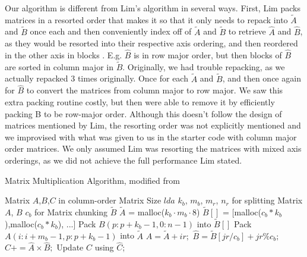 \documentclass{article}
\begin{document}
Our algorithm is different from Lim's algorithm in several ways. First, Lim packs matrices in a resorted order that makes it so that it only needs to repack into $\tilde{A}$ and $\tilde{B}$ once each and then conveniently index off of $\tilde{A}$ and $\tilde{B}$ to retrieve $\hat{A}$ and $\hat{B}$, as they would be resorted into their respective axis ordering, and then reordered in the other axis in blocks \cite{10.1007/s10586-018-2810-y}. E.g. $\hat{B}$ is in row major order, but then blocks of $\hat{B}$ are sorted in column major in $\tilde{B}$. Originally, we had trouble repacking, as we actually repacked 3 times originally. Once for each $\tilde{A}$ and $\tilde{B}$, and then once again for $\hat{B}$ to convert the matrices from column major to row major. We saw this extra packing routine costly, but then were able to remove it by efficiently packing B to be row-major order. Although this doesn't follow the design of matrices mentioned by Lim, the resorting order was not explicitly mentioned and we improvised with what was given to us in the starter code with column major order matrices. We only assumed Lim was resorting the matrices with mixed axis orderings, as we did not achieve the full performance Lim stated.

\begin{algorithm}[H]
\caption{Matrix Multiplication Algorithm, modified from \cite{10.1007/s10586-018-2810-y}}
\begin{algorithmic}
    \Require Matrix $A$,$B$,$C$ in  column-order
    \Require Matrix Size $lda$
    \Require $k_b$, $m_b$, $m_r$, $n_r$ for splitting Matrix $A$, $B$ 
    \Require $c_b$ for Matrix chunking $\tilde{B}$
    \State $\tilde{A}$ = malloc($k_b \cdot m_b \cdot 8$)
    \State $\tilde{B}[]$ = [malloc($c_b * k_b$),malloc($c_b * k_b$), ...] 
        \State Pack $B(p : p + k_b - 1, 0: n - 1)$ into $\tilde{B}[]$ 
            \State Pack $A(i : i + m_b - 1, p: p + k_b - 1)$ into $\tilde{A}$ 
                    \State $\hat{A} = \tilde{A} + ir;$
                    \State $\hat{B} = \tilde{B}[jr/c_b] + jr\%c_b;$
                    \State $\hat{C} += \hat{A}\times\hat{B};$ 
                    \State Update $C$ using $\hat{C}$;
                \EndFor    
            \EndFor    
        \EndFor    
    \EndFor
\end{algorithmic}
\label{alg:algorithm1}
\end{algorithm}
\end{document}
